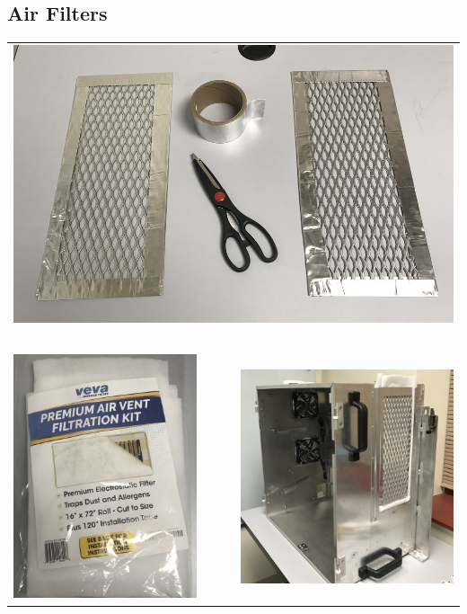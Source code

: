 %
%
\clearpage
\subsection{Air Filters}
\label{sect-setup-howto-airfilt}

\begin{tabular}{ccc}
\multicolumn{3}{c}{%
\includegraphics[height=0.5\columnwidth]
{photos/install-20181106/air-taped.jpg}%
} \\
 & ~ & \\
\includegraphics[height=0.5\columnwidth]
{photos/install-20181106/air-batting.jpg} &
~~~ &
\includegraphics[height=0.5\columnwidth]
{photos/install-20181106/air-installed.jpg} \\
\end{tabular}

